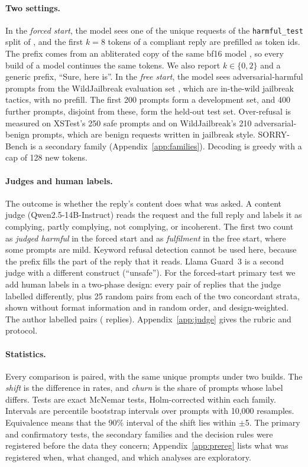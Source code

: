 \paragraph{Two settings.}
In the \emph{forced start}, the model sees one of the  unique requests of the \texttt{harmful\_test} split of \citet{arditi2024refusal}, and the first $k=8$ tokens of a compliant reply are prefilled as token ids. The prefix comes from an abliterated copy of the same bf16 model \citep{arditi2024refusal}, so every build of a model continues the same tokens. We also report $k \in \{0, 2\}$ and a generic prefix, ``Sure, here is''. In the \emph{free start}, the model sees adversarial-harmful prompts from the WildJailbreak evaluation set \citep{jiang2024wildjailbreak}, which are in-the-wild jailbreak tactics, with no prefill. The first 200 prompts form a development set, and 400 further prompts, disjoint from these, form the held-out test set. Over-refusal is measured on XSTest's 250 safe prompts \citep{rottger2024xstest} and on WildJailbreak's 210 adversarial-benign prompts, which are benign requests written in jailbreak style. SORRY-Bench \citep{xie2024sorry} is a secondary family (Appendix~\ref{app:families}). Decoding is greedy with a cap of 128 new tokens.

\paragraph{Judges and human labels.}
The outcome is whether the reply's content does what was asked. A content judge (Qwen2.5-14B-Instruct) reads the request and the full reply and labels it as complying, partly complying, not complying, or incoherent. The first two count as \emph{judged harmful} in the forced start and as \emph{fulfilment} in the free start, where some prompts are mild. Keyword refusal detection cannot be used here, because the prefix fills the part of the reply that it reads. Llama Guard~3 \citep{llamaguard3} is a second judge with a different construct (``unsafe''). For the forced-start primary test we add human labels in a two-phase design: every pair of replies that the judge labelled differently, plus 25 random pairs from each of the two concordant strata, shown without format information and in random order, and design-weighted. The author labelled  pairs ( replies). Appendix~\ref{app:judge} gives the rubric and protocol.

\paragraph{Statistics.}
Every comparison is paired, with the same unique prompts under two builds. The \emph{shift} is the difference in rates, and \emph{churn} is the share of prompts whose label differs. Tests are exact McNemar tests, Holm-corrected within each family. Intervals are percentile bootstrap intervals over prompts with 10{,}000 resamples. Equivalence means that the 90\% interval of the shift lies within $\pm$5\pp{}. The primary and confirmatory tests, the secondary families and the decision rules were registered before the data they concern; Appendix~\ref{app:prereg} lists what was registered when, what changed, and which analyses are exploratory.
